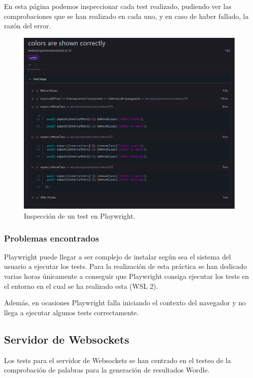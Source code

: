 En esta página podemos inspeccionar cada test realizado, pudiendo ver las comprobaciones que se han realizado en cada uno, y en caso de haber fallado, la razón del error.

\begin{figure}[H]
	\centering
	\includegraphics[clip=true, width=\textwidth]{images/tests/playwright_one_test.png}
	\caption{Inspección de un test en Playwright.}
	\label{fig:playwright_test_result}
\end{figure}

\subsubsection{Problemas encontrados}
Playwright puede llegar a ser complejo de instalar según sea el sistema del usuario a ejecutar los tests. Para la realización de esta práctica se han dedicado varias horas únicamente a conseguir que Playwright consiga ejecutar los tests en el entorno en el cual se ha realizado esta (WSL 2).

Además, en ocasiones Playwright falla iniciando el contexto del navegador y no llega a ejecutar algunos tests correctamente.

\subsection{Servidor de Websockets}
Los tests para el servidor de Websockets se han centrado en el testeo de la comprobación de palabras para la generación de resultados Wordle.

